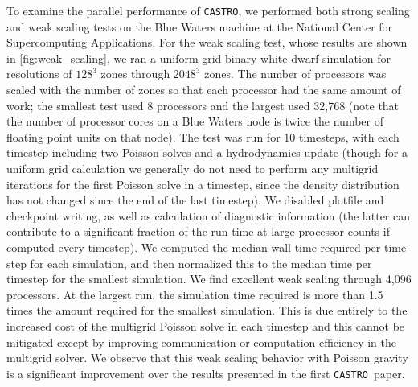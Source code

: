 \documentclass[iop]{../emulateapj}
\newcommand{\castro}{\texttt{CASTRO}}
\begin{document}
To examine the parallel performance of \castro, we performed both
strong scaling and weak scaling tests on the Blue Waters machine at
the National Center for Supercomputing Applications. For the weak
scaling test, whose results are shown in \autoref{fig:weak_scaling},
we ran a uniform grid binary white dwarf simulation for resolutions of
$128^3$ zones through $2048^3$ zones. The number of processors was
scaled with the number of zones so that each processor had the same
amount of work; the smallest test used 8 processors and the largest
used 32,768 (note that the number of processor cores on a Blue Waters
node is twice the number of floating point units on that node). The
test was run for 10 timesteps, with each timestep including two
Poisson solves and a hydrodynamics update (though for a uniform grid
calculation we generally do not need to perform any multigrid
iterations for the first Poisson solve in a timestep, since the
density distribution has not changed since the end of the last
timestep). We disabled plotfile and checkpoint writing, as well as
calculation of diagnostic information (the latter can contribute to a
significant fraction of the run time at large processor counts if
computed every timestep). We computed the median wall time required
per time step for each simulation, and then normalized this to the
median time per timestep for the smallest simulation. We find
excellent weak scaling through 4,096 processors. At the largest run,
the simulation time required is more than 1.5 times the amount
required for the smallest simulation.  This is due entirely to the
increased cost of the multigrid Poisson solve in each timestep and
this cannot be mitigated except by improving communication or
computation efficiency in the multigrid solver. We observe that this
weak scaling behavior with Poisson gravity is a significant
improvement over the results presented in the first \castro\ paper.
\end{document}
